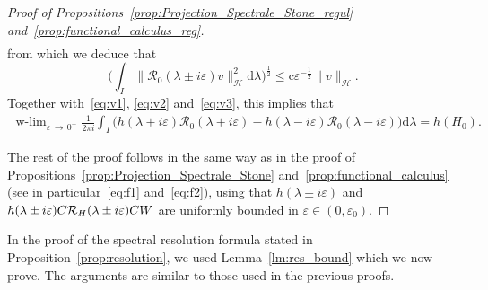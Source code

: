 \documentclass[10pt]{amsart}
\theoremstyle{definition}\newtheorem{defi}[theo]{Definition}\newtheorem{rema}[theo]{Remark}\newtheorem{exam}[theo]{Example}\newtheorem{exem}[theo]{Example}\newtheorem{nota}[theo]{Notation}
\newcommand{\Hi}{\mathcal{H}}
\newcommand{\rmc}{\mathrm{c}}
\newcommand{\rmd}{\mathrm{d}}
\newcommand{\Res}{\mathcal{R}}
\DeclareMathOperator{\wlim}{w-lim}
\begin{document}
\begin{proof}[Proof of Propositions~\ref{prop:Projection_Spectrale_Stone_regul} and~\ref{prop:functional_calculus_reg}]
\begin{equation}
\begin{split}
\end{split}
\end{equation}
from which we deduce that
\begin{equation}\label{eq:int_res_bound}
\Big(\int_I\big\|\Res_{0}(\lambda\pm i\varepsilon)v\big\|_\Hi^2\rmd \lambda\Big)^{\frac12}\le \rmc\varepsilon^{-\frac12}\|v\|_\Hi.
\end{equation}
Together with~\eqref{eq:v1}, \eqref{eq:v2} and~\eqref{eq:v3}, this implies that
\begin{align*}
\wlim_{\varepsilon\,\rightarrow\,0^+}\frac{1}{2\pi i}\int_I\big(h(\lambda+i\varepsilon)\Res_{0}(\lambda+i\varepsilon)-h(\lambda-i\varepsilon)\Res_{0}(\lambda-i\varepsilon)\big)\rmd \lambda=h(H_0).
\end{align*}

The rest of the proof follows in the same way as in the proof of Propositions~\ref{prop:Projection_Spectrale_Stone} and~\ref{prop:functional_calculus} (see in particular~\eqref{eq:f1} and~\eqref{eq:f2}), using that $h(\lambda\pm i\varepsilon)$ and $h(\lambda\pm i\varepsilon)C\Res_H\linebreak(\lambda\pm i\varepsilon)CW$ are uniformly bounded in $\varepsilon\in(0,\varepsilon_0)$.
\end{proof}

In the proof of the spectral resolution formula stated in Proposition~\ref{prop:resolution}, we used Lemma~\ref{lm:res_bound} which we now prove. The arguments are similar to those used in the previous proofs.
\end{document}
